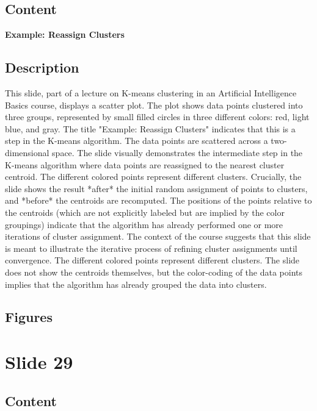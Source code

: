 \documentclass{article}%
\begin{document}
\subsection{Content}%

\textbf{Example: Reassign Clusters}
%
\subsection{Description}%
This slide, part of a lecture on K-means clustering in an Artificial Intelligence Basics course, displays a scatter plot.  The plot shows data points clustered into three groups, represented by small filled circles in three different colors: red, light blue, and gray.  The title "Example: Reassign Clusters" indicates that this is a step in the K-means algorithm.  The data points are scattered across a two-dimensional space.  The slide visually demonstrates the intermediate step in the K-means algorithm where data points are reassigned to the nearest cluster centroid.  The different colored points represent different clusters.  Crucially, the slide shows the result *after* the initial random assignment of points to clusters, and *before* the centroids are recomputed.  The positions of the points relative to the centroids (which are not explicitly labeled but are implied by the color groupings) indicate that the algorithm has already performed one or more iterations of cluster assignment.  The context of the course suggests that this slide is meant to illustrate the iterative process of refining cluster assignments until convergence.  The different colored points represent different clusters.  The slide does not show the centroids themselves, but the color-coding of the data points implies that the algorithm has already grouped the data into clusters.%
\subsection{Figures}%
\begin{figure}[H]%
\centering%
\end{figure}

%
\newpage%
\section{Slide 29}%
\label{sec:Slide29}%
\subsection{Content}%
\end{document}

